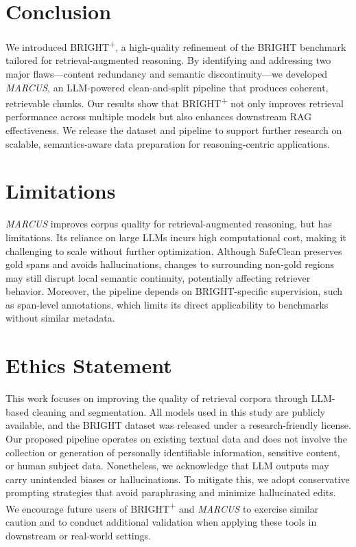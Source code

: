 \documentclass[11pt]{article}
\newcommand{\mymethod}{\emph{MARCUS}}
\begin{document}
\section{Conclusion}

We introduced BRIGHT\textsuperscript{+}, a high-quality refinement of the BRIGHT benchmark tailored for retrieval-augmented reasoning. By identifying and addressing two major flaws—content redundancy and semantic discontinuity—we developed \mymethod{}, an LLM-powered clean-and-split pipeline that produces coherent, retrievable chunks. Our results show that BRIGHT\textsuperscript{+} not only improves retrieval performance across multiple models but also enhances downstream RAG effectiveness. We release the dataset and pipeline to support further research on scalable, semantics-aware data preparation for reasoning-centric applications.






\section*{Limitations}

\mymethod{} improves corpus quality for retrieval-augmented reasoning, but has limitations. Its reliance on large LLMs incurs high computational cost, making it challenging to scale without further optimization. Although SafeClean preserves gold spans and avoids hallucinations, changes to surrounding non-gold regions may still disrupt local semantic continuity, potentially affecting retriever behavior. Moreover, the pipeline depends on BRIGHT-specific supervision, such as span-level annotations, which limits its direct applicability to benchmarks without similar metadata.


\section*{Ethics Statement}
This work focuses on improving the quality of retrieval corpora through LLM-based cleaning and segmentation. All models used in this study are publicly available, and the BRIGHT dataset was released under a research-friendly license. Our proposed pipeline operates on existing textual data and does not involve the collection or generation of personally identifiable information, sensitive content, or human subject data. Nonetheless, we acknowledge that LLM outputs may carry unintended biases or hallucinations. To mitigate this, we adopt conservative prompting strategies that avoid paraphrasing and minimize hallucinated edits. We encourage future users of BRIGHT\textsuperscript{+} and \mymethod{} to exercise similar caution and to conduct additional validation when applying these tools in downstream or real-world settings.
\end{document}

